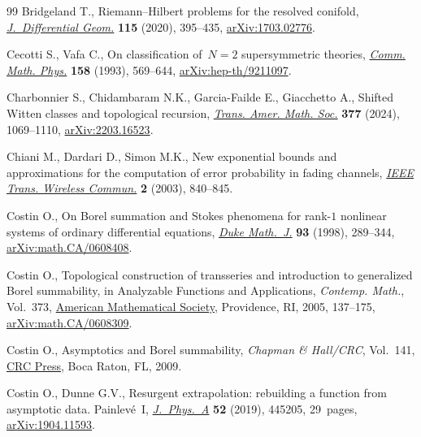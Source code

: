 \documentclass[10pt,a4paper]{amsart}
\numberwithin{equation}{section}
\begin{document}
\begin{thebibliography}{99}
Bridgeland T., Riemann--{H}ilbert problems for the resolved conifold,
 \href{https://doi.org/10.4310/jdg/1594260015}{\textit{J.~Differential Geom.}}
 \textbf{115} (2020), 395--435,
 \href{http://arxiv.org/abs/1703.02776}{arXiv:1703.02776}.

Cecotti S., Vafa C., On classification of~{$N=2$} supersymmetric theories,
 \href{https://doi.org/10.1007/BF02096804}{\textit{Comm. Math. Phys.}}
 \textbf{158} (1993), 569--644,
 \href{http://arxiv.org/abs/hep-th/9211097}{arXiv:hep-th/9211097}.

Charbonnier S., Chidambaram N.K., Garcia-Failde E., Giacchetto A., Shifted
 {W}itten classes and topological recursion,
 \href{https://doi.org/10.1090/tran/9046}{\textit{Trans. Amer. Math. Soc.}}
 \textbf{377} (2024), 1069--1110,
 \href{http://arxiv.org/abs/2203.16523}{arXiv:2203.16523}.

Chiani M., Dardari D., Simon M.K., New exponential bounds and approximations
 for the computation of error probability in fading channels,
 \href{https://doi.org/10.1109/TWC.2003.814350}{\textit{IEEE Trans. Wireless
 Commun.}} \textbf{2} (2003), 840--845.

Costin O., On {B}orel summation and {S}tokes phenomena for rank-{$1$} nonlinear
 systems of ordinary differential equations,
 \href{https://doi.org/10.1215/S0012-7094-98-09311-5}{\textit{Duke Math.~J.}}
 \textbf{93} (1998), 289--344,
 \href{http://arxiv.org/abs/math.CA/0608408}{arXiv:math.CA/0608408}.

Costin O., Topological construction of transseries and introduction to
 generalized {B}orel summability, in Analyzable {F}unctions and
 {A}pplications, \textit{Contemp. Math.}, Vol.~373,
 \href{https://doi.org/10.1090/conm/373/06918}{American Mathematical Society},
 Providence, RI, 2005, 137--175,
 \href{http://arxiv.org/abs/math.CA/0608309}{arXiv:math.CA/0608309}.

Costin O., Asymptotics and {B}orel summability, \textit{Chapman \& Hall/CRC},
 Vol.~141, \href{https://doi.org/10.1201/9781420070323}{CRC Press}, Boca Raton,
 FL, 2009.

Costin O., Dunne G.V., Resurgent extrapolation: rebuilding a function from
 asymptotic data. {P}ainlev\'e~{I},
 \href{https://doi.org/10.1088/1751-8121/ab477b}{\textit{J.~Phys.~A}}
 \textbf{52} (2019), 445205, 29~pages,
 \href{http://arxiv.org/abs/1904.11593}{arXiv:1904.11593}.


\end{thebibliography}
\end{document}
